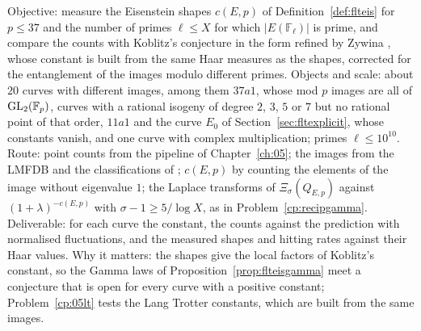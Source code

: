 \begin{compproblem}\label{cp:flteis}
Objective: measure the Eisenstein shapes $c(E,p)$ of Definition~\ref{def:flteis} for $p\le37$ and the number of primes $\ell\le X$ for which $|E(\mathbb F_\ell)|$ is prime, and compare the counts with Koblitz's conjecture \cite{koblitz1988} in the form refined by Zywina \cite{zywina2011}, whose constant is built from the same Haar measures as the shapes, corrected for the entanglement of the images modulo different primes. Objects and scale: about $20$ curves with different images, among them $37a1$, whose mod $p$ images are all of $\mathrm{GL}_2(\mathbb F_p)$, curves with a rational isogeny of degree $2$, $3$, $5$ or $7$ but no rational point of that order, $11a1$ and the curve $E_0$ of Section~\ref{sec:fltexplicit}, whose constants vanish, and one curve with complex multiplication; primes $\ell\le10^{10}$. Route: point counts from the pipeline of Chapter~\ref{ch:05}; the images from the LMFDB \cite{lmfdb} and the classifications of \cite{rszb2022,zywina2022}; $c(E,p)$ by counting the elements of the image without eigenvalue $1$; the Laplace transforms of $\Xi_\sigma(Q_{E,p})$ against $(1+\lambda)^{-c(E,p)}$ with $\sigma-1\ge5/\log X$, as in Problem~\ref{cp:recipgamma}. Deliverable: for each curve the constant, the counts against the prediction with normalised fluctuations, and the measured shapes and hitting rates against their Haar values. Why it matters: the shapes give the local factors of Koblitz's constant, so the Gamma laws of Proposition~\ref{prop:flteisgamma} meet a conjecture that is open for every curve with a positive constant; Problem~\ref{cp:05lt} tests the Lang Trotter constants, which are built from the same images.
\end{compproblem}

